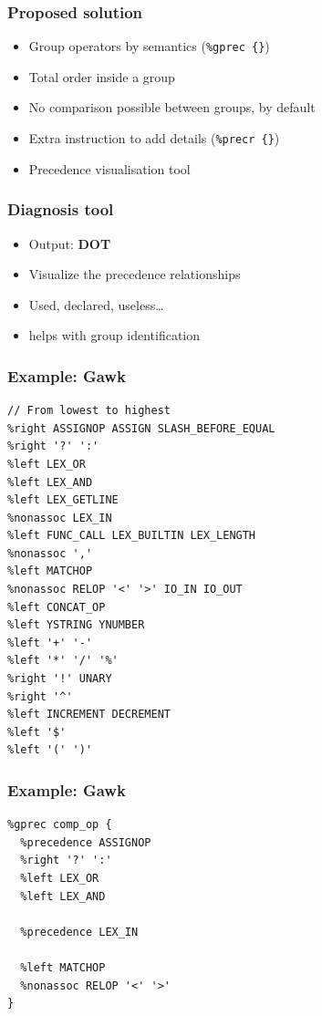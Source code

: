 \documentclass{beamer}
\begin{document}
\begin{frame}
  \frametitle{Proposed solution}
    \begin{itemize}
      \item Group operators by semantics (\texttt{\%gprec \{\}})
      \item Total order inside a group
      \item No comparison possible between groups, by default
      \item Extra instruction to add details (\texttt{\%precr \{\}})
      \item Precedence visualisation tool
    \end{itemize}
\end{frame}

\begin{frame}
  \frametitle{Diagnosis tool}
    \begin{itemize}
      \item Output: \textbf{DOT}
      \item Visualize the precedence relationships
      \item Used, declared, useless\ldots
      \item helps with group identification
    \end{itemize}
\end{frame}

\begin{frame}[fragile]
  \frametitle{Example: Gawk}
  \footnotesize{%
  \begin{verbatim}
// From lowest to highest
%right ASSIGNOP ASSIGN SLASH_BEFORE_EQUAL
%right '?' ':'
%left LEX_OR
%left LEX_AND
%left LEX_GETLINE
%nonassoc LEX_IN
%left FUNC_CALL LEX_BUILTIN LEX_LENGTH
%nonassoc ','
%left MATCHOP
%nonassoc RELOP '<' '>' IO_IN IO_OUT
%left CONCAT_OP
%left YSTRING YNUMBER
%left '+' '-'
%left '*' '/' '%'
%right '!' UNARY
%right '^'
%left INCREMENT DECREMENT
%left '$'
%left '(' ')'
\end{verbatim}
}
\end{frame}


\begin{frame}[fragile]
  \frametitle{Example: Gawk}
\begin{verbatim}
%gprec comp_op {
  %precedence ASSIGNOP
  %right '?' ':'
  %left LEX_OR
  %left LEX_AND

  %precedence LEX_IN

  %left MATCHOP
  %nonassoc RELOP '<' '>'
}

\end{verbatim}
\end{frame}
\end{document}
